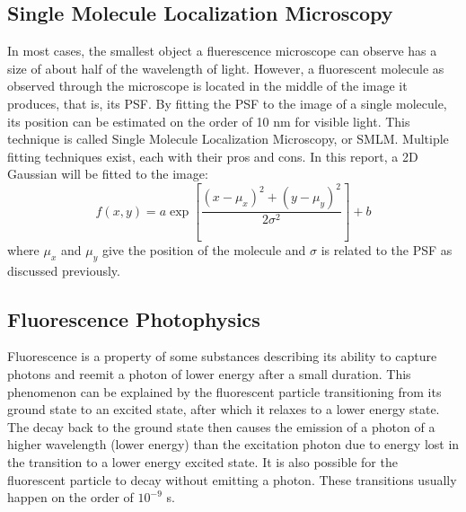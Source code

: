 \subsection{Single Molecule Localization Microscopy}
In most cases, the smallest object a fluerescence microscope can observe has a size of about half of the wavelength of light. However, a fluorescent molecule as observed through the microscope is located in the middle of the image it produces, that is, its PSF. By fitting the PSF to the image of a single molecule, its position can be estimated on the order of 10 nm for visible light. This technique is called Single Molecule Localization Microscopy, or SMLM. Multiple fitting techniques exist, each with their pros and cons. In this report, a 2D Gaussian will be fitted to the image:
\begin{equation}
    f(x, y) = a \exp \left[ \frac{(x-\mu_x)^2 + (y-\mu_y)^2}{2 \sigma^2} \right] + b
\end{equation}
where $\mu_x$ and $\mu_y$ give the position of the molecule and $\sigma$ is related to the PSF as discussed previously.




\subsection{Fluorescence Photophysics}

Fluorescence is a property of some substances describing its ability to capture photons and reemit a photon of lower energy after a small duration. This phenomenon can be explained by the fluorescent particle transitioning from its ground state to an excited state, after which it relaxes to a lower energy state. The decay back to the ground state then causes the emission of a photon of a higher wavelength (lower energy) than the excitation photon due to energy lost in the transition to a lower energy excited state. It is also possible for the fluorescent particle to decay without emitting a photon. These transitions usually happen on the order of $10^{-9}$ s.

